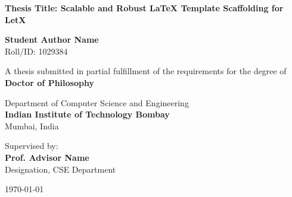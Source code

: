 \begin{titlepage}
\begin{center}
    \vspace*{1cm}
    
    
    \vspace{1.5cm}
    
    {\huge \bfseries \color{primary} Thesis Title: Scalable and Robust LaTeX Template Scaffolding for LetX}
    
    \vspace{1.5cm}
    
    {\Large \bfseries Student Author Name} \\
    \vspace{0.2cm}
    {Roll/ID: 1029384}
    
    \vspace{1.5cm}
    
    {A thesis submitted in partial fulfillment of the requirements for the degree of} \\
    \vspace{0.3cm}
    {\large \bfseries \color{secondary} Doctor of Philosophy}
    
    \vspace{1.5cm}
    
    {Department of Computer Science and Engineering} \\
    \vspace{0.2cm}
    {\large \bfseries \color{primary} Indian Institute of Technology Bombay} \\
    \vspace{0.1cm}
    {Mumbai, India}
    
    \vfill
    
    {Supervised by:} \\
    {\large \bfseries Prof. Advisor Name} \\
    {Designation, CSE Department}
    
    \vspace{1cm}
    
    {\large \today}
    
\end{center}
\end{titlepage}
